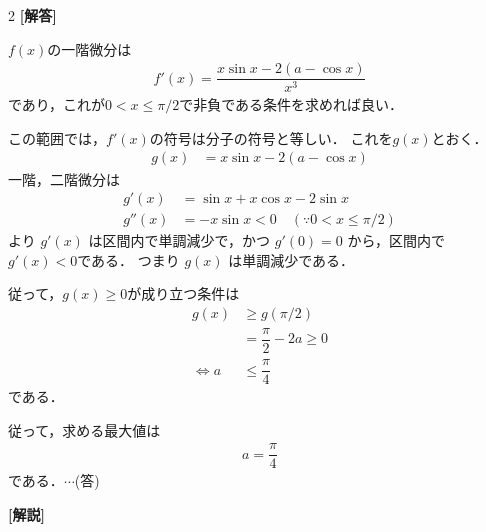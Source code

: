 \documentclass[../../main.tex]{subfiles}
\begin{document}
\setcounter{equation}{0}
\begin{oframed}
  
\end{oframed}
\setlength{\columnseprule}{0.4pt}
\begin{multicols}{2}
  {\bf [解答]}

  $f(x)$の一階微分は
  \begin{align}
    f'(x) = \dfrac{x\sin x-2(a-\cos x)}{x^3}
  \end{align}
  であり，これが$0 < x \le \pi/2$で非負である条件を求めれば良い．

  この範囲では，$f'(x)$の符号は分子の符号と等しい．
  これを$g(x)$とおく．
  \begin{align}
    g(x) & = x\sin x - 2(a-\cos x)
  \end{align}
  一階，二階微分は
  \begin{align}
    g'(x)  & = \sin x + x\cos x - 2\sin x                    \\
    g''(x) & = -x\sin x < 0 \quad (\because 0 < x \le \pi/2)
  \end{align}
  より $g'(x)$ は区間内で単調減少で，かつ $g'(0) = 0$ から，区間内で$g'(x) < 0$である．
  つまり $g(x)$ は単調減少である．

  従って，$g(x)\ge 0$が成り立つ条件は
  \begin{align}
    g(x)
    & \ge g(\pi/2)               \\
    & = \dfrac{\pi}{2} - 2a \ge 0 \\
    \iff
    a & \le \dfrac{\pi}{4}
  \end{align}
  である．

  従って，求める最大値は
  \begin{align}
    a=\dfrac{\pi}{4}
  \end{align}
  である．$\cdots$(答)

  {\bf [解説]}

  \newpage
\end{multicols}
\end{document}
